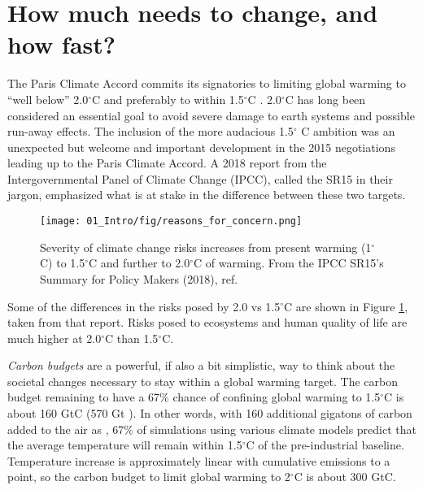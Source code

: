 
\section{How much needs to change, and how fast?}

The Paris Climate Accord commits its signatories to limiting global warming to ``well below'' 2.0$^\circ$C and preferably to within 1.5$^\circ$C \cite{UnitedNations2015}. 2.0$^\circ$C has long been considered an essential goal to avoid severe damage to earth systems and possible run-away effects\cite{Meinshausen2009, Allen2009, IPCC2014}. The inclusion of the more audacious 1.5$^\circ$ C ambition was an unexpected but welcome and important development in the 2015 negotiations leading up to the Paris Climate Accord. A 2018 report from the Intergovernmental Panel of Climate Change (IPCC), called the SR15 in their jargon, emphasized what is at stake in the difference between these two targets\cite{IPCC2018_SPM}. 
\begin{figure}[b!]
	\centering
	\texttt{[image: 01\_Intro/fig/reasons\_for\_concern.png]}
	\caption{Severity of climate change risks increases from present warming (1$^\circ$C) to 1.5$^\circ$C and further to 2.0$^\circ$C of warming. From the IPCC SR15's Summary for Policy Makers (2018), ref. \cite{IPCC2018_SPM}}
	\label{fig:RFC}
\end{figure}
Some of the differences in the risks posed by 2.0 vs 1.5$^\circ$C are shown in Figure \ref{fig:RFC}, taken from that report. Risks posed to ecosystems and human quality of life are much higher at 2.0$^\circ$C than 1.5$^\circ$C.

\textit{Carbon budgets} are a powerful, if also a bit simplistic\cite{Peters2018}, way to think about the societal changes necessary to stay within a global warming target. The carbon budget remaining to have a 67\% chance of confining global warming to 1.5$^\circ$C is about 160 GtC (570 Gt )\cite{IPCC2018_ch2}. In other words, with 160 additional gigatons of carbon added to the air as , 67\% of simulations using various climate models predict that the average temperature will remain within 1.5$^\circ$C of the pre-industrial baseline. Temperature increase is approximately linear with cumulative  emissions to a point\cite{IPCC2018_ch2}, so the carbon budget to limit global warming to 2$^\circ$C is about 300 GtC.

